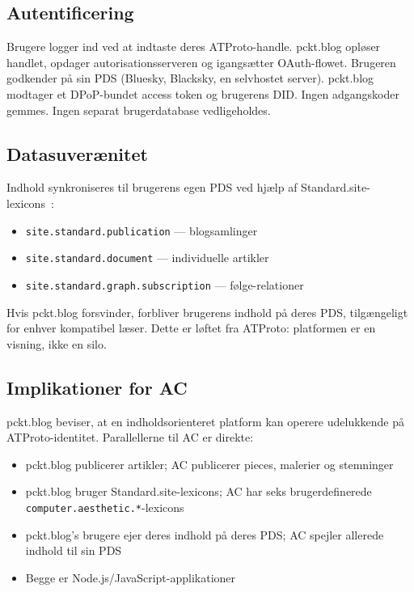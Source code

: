 \documentclass[10pt,letterpaper,twocolumn]{article}
\begin{document}
\subsection{Autentificering}

Brugere logger ind ved at indtaste deres ATProto-handle. pckt.blog opløser handlet, opdager autorisationsserveren og igangsætter OAuth-flowet. Brugeren godkender på sin PDS (Bluesky, Blacksky, en selvhostet server). pckt.blog modtager et DPoP-bundet access token og brugerens DID. Ingen adgangskoder gemmes. Ingen separat brugerdatabase vedligeholdes.

\subsection{Datasuverænitet}

Indhold synkroniseres til brugerens egen PDS ved hjælp af Standard.site-lexicons~\citep{standardsite2025}:

\begin{itemize}
  \item \texttt{site.standard.publication} --- blogsamlinger
  \item \texttt{site.standard.document} --- individuelle artikler
  \item \texttt{site.standard.graph.subscription} --- følge-relationer
\end{itemize}

Hvis pckt.blog forsvinder, forbliver brugerens indhold på deres PDS, tilgængeligt for enhver kompatibel læser. Dette er løftet fra ATProto: platformen er en visning, ikke en silo.

\subsection{Implikationer for AC}

pckt.blog beviser, at en indholdsorienteret platform kan operere udelukkende på ATProto-identitet. Parallellerne til AC er direkte:

\begin{itemize}
  \item pckt.blog publicerer artikler; AC publicerer pieces, malerier og stemninger
  \item pckt.blog bruger Standard.site-lexicons; AC har seks brugerdefinerede \texttt{computer.aesthetic.*}-lexicons
  \item pckt.blog's brugere ejer deres indhold på deres PDS; AC spejler allerede indhold til sin PDS
  \item Begge er Node.js/JavaScript-applikationer
\end{itemize}
\end{document}
